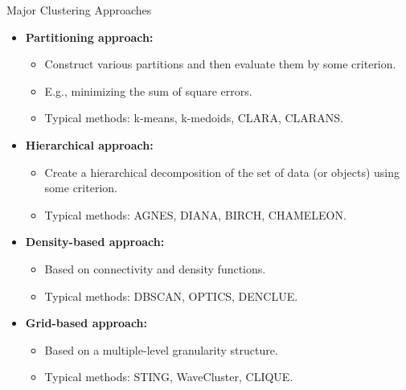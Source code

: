 \begin{frame}{Major Clustering Approaches}
	\begin{itemize}
		\item \textbf{Partitioning approach:}
		\begin{itemize}
			\item Construct various partitions and then evaluate them by some 
			criterion.
			\item E.g., minimizing the sum of square errors.
			\item Typical methods: k-means, k-medoids, CLARA, CLARANS.
		\end{itemize}
		\item \textbf{Hierarchical approach:}
		\begin{itemize}
			\item Create a hierarchical decomposition of the set of data (or 
			objects) using some criterion.
			\item Typical methods: AGNES, DIANA, BIRCH, CHAMELEON.
		\end{itemize}
		\item \textbf{Density-based approach:}
		\begin{itemize}
			\item Based on connectivity and density functions.
			\item Typical methods: DBSCAN, OPTICS, DENCLUE.
		\end{itemize}
		\item \textbf{Grid-based approach:}
		\begin{itemize}
			\item Based on a multiple-level granularity structure.
			\item Typical methods: STING, WaveCluster, CLIQUE.
		\end{itemize}
	\end{itemize}
\end{frame}

